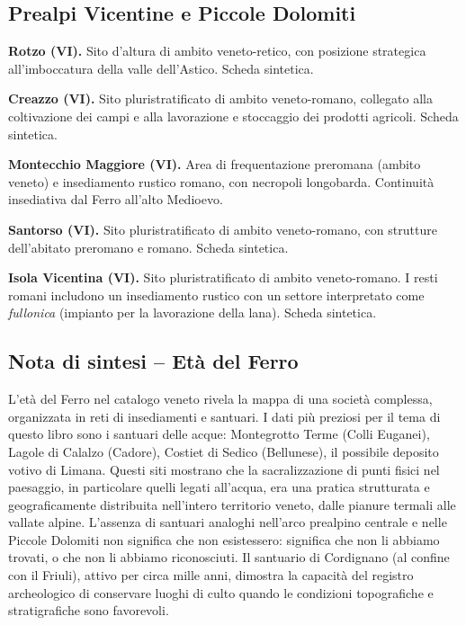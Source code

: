 \subsection{Prealpi Vicentine e Piccole Dolomiti}

\textbf{Rotzo (VI).} Sito d'altura di ambito veneto-retico, con posizione strategica all'imboccatura della valle dell'Astico. Scheda sintetica.

\textbf{Creazzo (VI).} Sito pluristratificato di ambito veneto-romano, collegato alla coltivazione dei campi e alla lavorazione e stoccaggio dei prodotti agricoli. Scheda sintetica.

\textbf{Montecchio Maggiore (VI).} Area di frequentazione preromana (ambito veneto) e insediamento rustico romano, con necropoli longobarda. Continuità insediativa dal Ferro all'alto Medioevo.

\textbf{Santorso (VI).} Sito pluristratificato di ambito veneto-romano, con strutture dell'abitato preromano e romano. Scheda sintetica.

\textbf{Isola Vicentina (VI).} Sito pluristratificato di ambito veneto-romano. I resti romani includono un insediamento rustico con un settore interpretato come \textit{fullonica} (impianto per la lavorazione della lana). Scheda sintetica.

\subsection*{Nota di sintesi -- Età del Ferro}

L'età del Ferro nel catalogo veneto rivela la mappa di una società complessa, organizzata in reti di insediamenti e santuari. I dati più preziosi per il tema di questo libro sono i santuari delle acque: Montegrotto Terme (Colli Euganei), Lagole di Calalzo (Cadore), Costiet di Sedico (Bellunese), il possibile deposito votivo di Limana. Questi siti mostrano che la sacralizzazione di punti fisici nel paesaggio, in particolare quelli legati all'acqua, era una pratica strutturata e geograficamente distribuita nell'intero territorio veneto, dalle pianure termali alle vallate alpine. L'assenza di santuari analoghi nell'arco prealpino centrale e nelle Piccole Dolomiti non significa che non esistessero: significa che non li abbiamo trovati, o che non li abbiamo riconosciuti. Il santuario di Cordignano (al confine con il Friuli), attivo per circa mille anni, dimostra la capacità del registro archeologico di conservare luoghi di culto quando le condizioni topografiche e stratigrafiche sono favorevoli.

